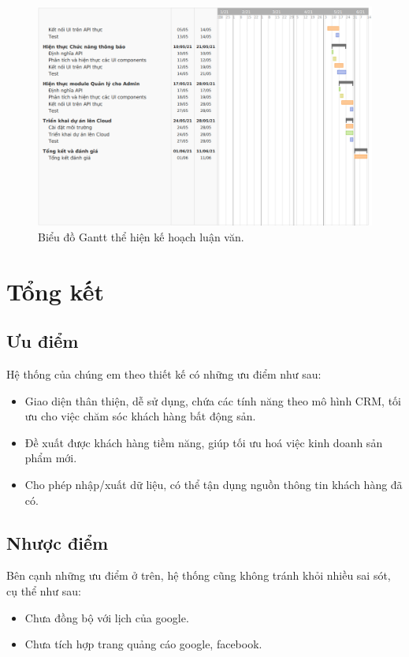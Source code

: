 \documentclass[12pt,a4paper]{article}
\begin{document}
    \begin{figure}
        \includegraphics[width=\textwidth]{Img/KeHoachLV/4.png}
        \caption{Biểu đồ Gantt thể hiện kế hoạch luận văn.}
        \label{fig:Architecture}
    \end{figure}
    \newpage


    \section{Tổng kết}

    \subsection{Ưu điểm}
    Hệ thống của chúng em theo thiết kế có những ưu điểm như sau:
    \begin{itemize}
        \item Giao diện thân thiện, dễ sử dụng, chứa các tính năng theo mô hình CRM, tối ưu cho việc chăm sóc khách hàng bất động sản.
        \item Đề xuất được khách hàng tiềm năng, giúp tối ưu hoá việc kinh doanh sản phẩm mới.
        \item Cho phép nhập/xuất dữ liệu, có thể tận dụng nguồn thông tin khách hàng đã có.
    \end{itemize}

    \subsection{Nhược điểm}
    Bên cạnh những ưu điểm ở trên, hệ thống cũng không tránh khỏi nhiều sai sót, cụ thể như sau:
    \begin{itemize}
        \item Chưa đồng bộ với lịch của google.
        \item Chưa tích hợp trang quảng cáo google, facebook.
    \end{itemize}
\end{document}
